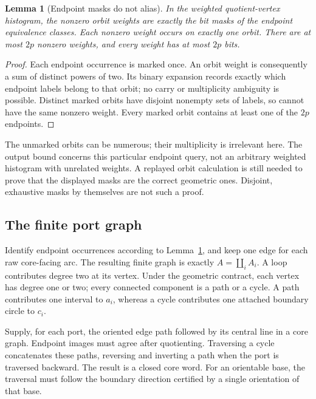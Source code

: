 \documentclass[11pt]{article}
\newtheorem{lemma}[theorem]{Lemma}
\theoremstyle{definition}
\theoremstyle{remark}
\begin{document}
\begin{lemma}[Endpoint masks do not alias]
\label{lem:masks}
In the weighted quotient-vertex histogram, the nonzero orbit weights are
exactly the bit masks of the endpoint equivalence classes. Each nonzero
weight occurs on exactly one orbit. There are at most $2p$ nonzero weights,
and every weight has at most $2p$ bits.
\end{lemma}
\begin{proof}
Each endpoint occurrence is marked once. An orbit weight is consequently a
sum of distinct powers of two. Its binary expansion records exactly which
endpoint labels belong to that orbit; no carry or multiplicity ambiguity is
possible. Distinct marked orbits have disjoint nonempty sets of labels, so
cannot have the same nonzero weight. Every marked orbit contains at least
one of the $2p$ endpoints.
\end{proof}

The unmarked orbits can be numerous; their multiplicity is irrelevant here.
The output bound concerns this particular endpoint query, not an arbitrary
weighted histogram with unrelated weights. A replayed orbit calculation is
still needed to prove that the displayed masks are the correct geometric
ones. Disjoint, exhaustive masks by themselves are not such a proof.

\subsection{The finite port graph}
Identify endpoint occurrences according to Lemma~\ref{lem:masks}, and keep
one edge for each raw core-facing arc. The resulting finite graph is exactly
$A=\coprod_i A_i$. A loop contributes degree two at its vertex. Under the
geometric contract, each vertex has degree one or two; every connected
component is a path or a cycle. A path contributes one interval to $a_i$,
whereas a cycle contributes one attached boundary circle to $c_i$.

Supply, for each port, the oriented edge path followed by its central line
in a core graph. Endpoint images must agree after quotienting. Traversing
a cycle concatenates these paths, reversing and inverting a path when the
port is traversed backward. The result is a closed core word. For an
orientable base, the traversal must follow the boundary direction certified
by a single orientation of that base.
\end{document}
